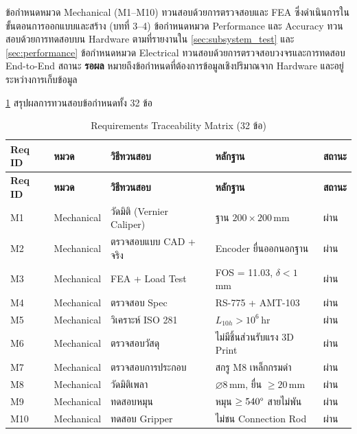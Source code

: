 ข้อกำหนดหมวด Mechanical (M1--M10) ทวนสอบด้วยการตรวจสอบและ FEA
ซึ่งดำเนินการในขั้นตอนการออกแบบและสร้าง (บทที่ 3--4)
ข้อกำหนดหมวด Performance และ Accuracy ทวนสอบด้วยการทดสอบบน Hardware
ตามที่รายงานใน \cref{sec:subsystem_test} และ \cref{sec:performance}
ข้อกำหนดหมวด Electrical ทวนสอบด้วยการตรวจสอบวงจรและการทดสอบ End-to-End
สถานะ \textbf{รอผล} หมายถึงข้อกำหนดที่ต้องการข้อมูลเชิงปริมาณจาก Hardware
และอยู่ระหว่างการเก็บข้อมูล

\cref{tab:vnv_matrix} สรุปผลการทวนสอบข้อกำหนดทั้ง 32 ข้อ

\small
\setlength{\LTcapwidth}{\textwidth}
\begin{longtable}{
  >{\raggedright\arraybackslash}p{0.9cm}
  >{\raggedright\arraybackslash}p{2.0cm}
  >{\raggedright\arraybackslash}p{3.5cm}
  >{\raggedright\arraybackslash}p{5.2cm}
  >{\raggedright\arraybackslash}p{1.7cm}
}
  \caption{Requirements Traceability Matrix (32 ข้อ)}
  \label{tab:vnv_matrix} \\
  \toprule
  \textbf{Req ID} & \textbf{หมวด} & \textbf{วิธีทวนสอบ} & \textbf{หลักฐาน} & \textbf{สถานะ} \\
  \midrule
  \endfirsthead
  \toprule
  \textbf{Req ID} & \textbf{หมวด} & \textbf{วิธีทวนสอบ} & \textbf{หลักฐาน} & \textbf{สถานะ} \\
  \midrule
  \endhead
  \bottomrule
  \endfoot
  M1  & Mechanical & วัดมิติ (Vernier Caliper) & ฐาน $200 \times 200$\,mm & ผ่าน \\
  M2  & Mechanical & ตรวจสอบแบบ CAD + จริง    & Encoder ยื่นออกนอกฐาน & ผ่าน \\
  M3  & Mechanical & FEA + Load Test           & FOS = 11.03, $\delta < 1$\,mm & ผ่าน \\
  M4  & Mechanical & ตรวจสอบ Spec              & RS-775 + AMT-103 & ผ่าน \\
  M5  & Mechanical & วิเคราะห์ ISO 281          & $L_{10h} > 10^6$\,hr & ผ่าน \\
  M6  & Mechanical & ตรวจสอบวัสดุ              & ไม่มีชิ้นส่วนรับแรง 3D Print & ผ่าน \\
  M7  & Mechanical & ตรวจสอบการประกอบ          & สกรู M8 เหล็กกรมดำ & ผ่าน \\
  M8  & Mechanical & วัดมิติเพลา               & $\varnothing$8\,mm, ยื่น $\geq 20$\,mm & ผ่าน \\
  M9  & Mechanical & ทดสอบหมุน                 & หมุน $\geq 540\degree$ สายไม่พัน & ผ่าน \\
  M10 & Mechanical & ทดสอบ Gripper             & ไม่ชน Connection Rod & ผ่าน \\

\end{longtable}
